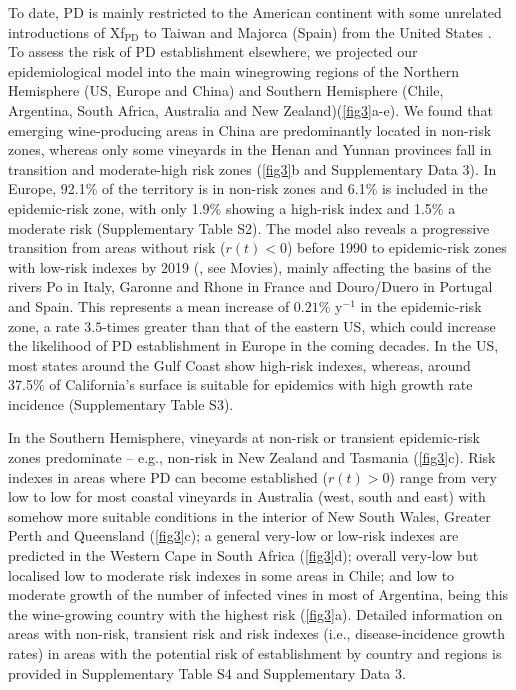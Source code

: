     To date, PD is mainly restricted to the American continent with some
    unrelated
    introductions of Xf$_{\textrm{PD}}$ to Taiwan and Majorca (Spain) from the
    United States \cite{Moralejo2019,Su2013}. To assess the risk of PD
    establishment elsewhere, we projected our epidemiological model into the
    main
    winegrowing regions of the Northern Hemisphere (US, Europe and China) and
    Southern Hemisphere (Chile, Argentina, South Africa, Australia and New
    Zealand)(\cref{fig3}a-e). We found that emerging wine-producing areas in
    China
    are predominantly located in non-risk zones, whereas only some vineyards in
    the
    Henan and Yunnan provinces fall in transition and moderate-high risk zones
    (\cref{fig3}b and Supplementary Data 3). In Europe, 92.1\% of the territory
    is
    in non-risk zones and 6.1\% is included in the epidemic-risk zone, with
    only
    1.9\% showing a high-risk index and 1.5\% a moderate risk (Supplementary
    Table
    S2). The model also reveals a progressive transition from areas without
    risk
    ($r(t) < 0$) before 1990 to epidemic-risk zones with low-risk indexes by
    2019
    (\cite{Webpage}, see Movies), mainly affecting the basins of the rivers Po
    in
    Italy, Garonne and Rhone in France and Douro/Duero in Portugal and Spain.
    This
    represents a mean increase of $0.21\%$ y$^{-1}$ in the epidemic-risk zone,
    a
    rate $3.5$-times greater than that of the eastern US, which could increase
    the
    likelihood of PD establishment in Europe in the coming decades. In the US,
    most
    states around the Gulf Coast show high-risk indexes, whereas, around 37.5\%
    of
    California's surface is suitable for epidemics with high growth rate
    incidence
    (Supplementary Table S3).

    In the Southern Hemisphere, vineyards at non-risk or transient
    epidemic-risk
    zones predominate -- e.g., non-risk in New Zealand and Tasmania
    (\cref{fig3}c).
    Risk indexes in areas where PD can become established ($r(t) > 0$) range
    from
    very low to low for most coastal vineyards in Australia (west, south and
    east)
    with somehow more suitable conditions in the interior of New South Wales,
    Greater Perth and Queensland (\cref{fig3}c); a general very-low or low-risk
    indexes are predicted in the Western Cape in South Africa (\cref{fig3}d);
    overall very-low but localised low to moderate risk indexes in some areas
    in
    Chile; and low to moderate growth of the number of infected vines in most
    of
    Argentina, being this the wine-growing country with the highest risk
    (\cref{fig3}a). Detailed information on areas with non-risk, transient risk
    and
    risk indexes (i.e., disease-incidence growth rates) in areas with the
    potential
    risk of establishment by country and regions is provided in Supplementary
    Table
    S4 and Supplementary Data 3.

